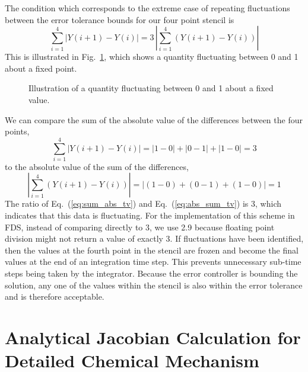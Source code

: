 The condition which corresponds to the extreme case of repeating fluctuations between the error tolerance bounds for our four point stencil is
\begin{equation}\label{eq:TV}
\sum_{i=1}^{4}|Y(i+1)-Y(i)| = 3 \, |\sum_{i=1}^{4}(Y(i+1)-Y(i))|
\end{equation}
This is illustrated in Fig.~\ref{fig:TV}, which shows a quantity fluctuating between 0 and 1 about a fixed point.
\begin{figure}
\begin{center}
\caption[Illustration of a quantity fluctuating about a fixed point]{\label{fig:TV} Illustration of a quantity fluctuating between 0 and 1 about a fixed value.}
\end{center}
\end{figure}
We can compare the sum of the absolute value of the differences between the four points,
\begin{equation}\label{eq:sum_abs_tv}
\displaystyle \sum_{i=1}^{4}|Y(i+1)-Y(i)| = |1-0| + |0-1| + |1-0| = 3
\end{equation}
to the absolute value of the sum of the differences,
\begin{equation}\label{eq:abs_sum_tv}
|\displaystyle \sum_{i=1}^{4}(Y(i+1)-Y(i))| = |(1-0)+(0-1)+(1-0)| = 1
\end{equation}
The ratio of Eq.~(\ref{eq:sum_abs_tv}) and Eq.~(\ref{eq:abs_sum_tv}) is 3, which indicates that this data is fluctuating. For the implementation of this scheme in FDS, instead of comparing directly to 3, we use 2.9 because floating point division might not return a value of exactly 3. If fluctuations have been identified, then the values at the fourth point in the stencil are frozen and become the final values at the end of an integration time step. This prevents unnecessary sub-time steps being taken by the integrator. Because the error controller is bounding the solution, any one of the values within the stencil is also within the error tolerance and is therefore acceptable.


\chapter{Analytical Jacobian Calculation for Detailed Chemical Mechanism}
\label{chemistry_analytical_jacobian}

